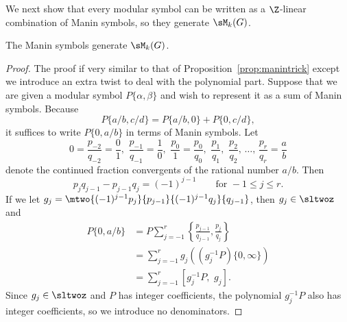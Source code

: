 We next show that every modular symbol can be written as
a $\Z$-linear combination of Manin symbols, 
so they generate $\sM_k(G)$. 
\begin{proposition}\label{prop:mangen}
The Manin symbols generate $\sM_k(G)$.
\end{proposition}
\begin{proof}
The proof if very similar to that
of Proposition~\ref{prop:manintrick} except we introduce an
extra twist to deal with the polynomial part.
Suppose that we are given a modular
symbol $P\{\alpha,\beta\}$ and wish to represent it as a 
sum of Manin symbols.   Because 
    $$P\{a/b,c/d\} = P\{a/b,0\}+P\{0,c/d\},$$
it suffices to write $P\{0,a/b\}$ in
terms of Manin symbols. 
Let
$$0=\frac{p_{-2}}{q_{-2}} = \frac{0}{1},\,\,
\frac{p_{-1}}{q_{-1}}=\frac{1}{0},\,\,
\frac{p_0}{1}=\frac{p_0}{q_0},\,\,
\frac{p_1}{q_1},\,\,
\frac{p_2}{q_2},\,\ldots,\,\frac{p_r}{q_r}=\frac{a}{b}$$
denote the continued fraction convergents of the 
rational number $a/b$. 
Then
$$p_j q_{j-1} 
  - p_{j-1} q_j = (-1)^{j-1}\qquad \text{for }-1\leq j\leq r.$$
If we let
$g_j = \mtwo{(-1)^{j-1}p_j}{p_{j-1}}{(-1)^{j-1}q_j}{q_{j-1}}$,
then $g_j\in\sltwoz$ and 
\begin{align*}
  P\{0,a/b\}
 &=P\sum_{j=-1}^{r}\left\{\frac{p_{j-1}}{q_{j-1}},\frac{p_j}{q_j}\right\}\\
 &=\sum_{j=-1}^{r} g_j((g_j^{-1}P)\{0,\infty\})\\
 &=\sum_{j=-1}^{r} [g_j^{-1}P,\,\,g_j].
\end{align*}
Since $g_j\in\sltwoz$ and $P$ has integer coefficients, 
the polynomial $g_j^{-1}P$ also has integer coefficients,
so we introduce no denominators.
\end{proof}

